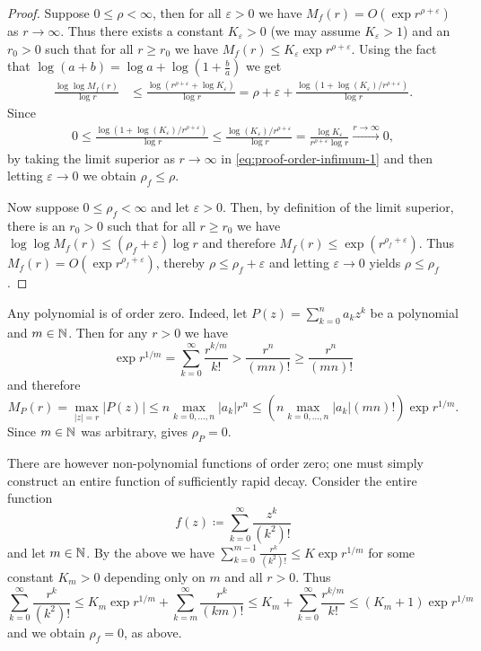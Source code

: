 \begin{proof}
    Suppose $0 \leq \rho < \infty$, then for all $\varepsilon > 0$ we have $M_f(r) = O(\exp r^{\rho + \varepsilon})$ as $r \to \infty$. Thus there exists a constant $K_\varepsilon > 0$ (we may assume $K_\varepsilon > 1$) and an $r_0 > 0$ such that for all $r \geq r_0$ we have $M_f(r) \leq K_\varepsilon \exp r^{\rho+\varepsilon}$. Using the fact that $\log (a+b) = \log a + \log (1 + \frac{b}{a})$ we get
    \begin{align*}
        \frac{\log \log M_f(r)}{\log r} &\leq \frac{\log (r^{\rho + \varepsilon} + \log K_\varepsilon)}{\log r} = \rho + \varepsilon + \frac{\log (1 + \log (K_\varepsilon) / r^{\rho + \varepsilon})}{\log r}. \tag{\textasteriskcentered} \label{eq:proof-order-infimum-1}
    \end{align*}
    Since
    \begin{align*}
        0 \leq \frac{\log (1 + \log (K_\varepsilon) / r^{\rho + \varepsilon})}{\log r} \leq \frac{\log (K_\varepsilon) / r^{\rho + \varepsilon}}{\log r} = \frac{\log K_\varepsilon}{r^{\rho + \varepsilon} \log r} \xrightarrow{r \to \infty} 0,
    \end{align*}
    by taking the limit superior as $r \to \infty$ in \eqref{eq:proof-order-infimum-1} and then letting $\varepsilon \to 0$ we obtain $\rho_f \leq \rho$.

    Now suppose $0 \leq \rho_f < \infty$ and let $\varepsilon > 0$. Then, by definition of the limit superior, there is an $r_0 > 0$ such that for all $r \geq r_0$ we have $ \log \log M_f(r) \leq (\rho_f + \varepsilon) \log r$ and therefore $M_f(r) \leq \exp(r^{\rho_f + \varepsilon})$. Thus $M_f(r) = O(\exp r^{\rho_f + \varepsilon})$, thereby $\rho \leq \rho_f + \varepsilon$ and letting $\varepsilon \to 0$ yields $\rho \leq \rho_f$.
\end{proof}

\begin{remark} \label{rem:order-zero}
    Any polynomial is of order zero. Indeed, let $P(z) = \sum_{k=0}^n a_k z^k$ be a polynomial and $m \in \mathbb{N}$. Then for any $r > 0$ we have
    $$ \exp r^{1/m} = \sum_{k=0}^\infty \frac{r^{k/m}}{k!} > \frac{r^{n}}{(mn)!} \geq \frac{r^{n}}{(mn)!} $$
    and therefore
    $$ M_P(r) = \max_{\vert z \vert = r} \vert P(z) \vert \leq n \max_{k = 0, \hdots, n} \vert a_k \vert r^n \leq \left( n \max_{k = 0, \hdots, n} \vert a_k \vert (mn)! \right) \exp r^{1/m}. $$
    Since $m \in \mathbb{N}$ was arbitrary,  gives $\rho_P = 0$.

    There are however non-polynomial functions of order zero; one must simply construct an entire function of sufficiently rapid decay. Consider the entire function
    $$ f(z) \coloneqq \sum_{k=0}^\infty \frac{z^k}{(k^2)!} $$
    and let $m \in \mathbb{N}$. By the above we have $\sum_{k=0}^{m-1} \frac{r^k}{(k^2)!} \leq K \exp r^{1/m}$ for some constant $K_m > 0$ depending only on $m$ and all $r > 0$. Thus
    $$ \sum_{k=0}^\infty \frac{r^k}{(k^2)!} \leq K_m \exp r^{1/m} + \sum_{k=m}^\infty \frac{r^k}{(km)!} \leq K_m + \sum_{k=0}^\infty \frac{r^{k/m}}{k!} \leq (K_m + 1) \exp r^{1/m} $$
    and we obtain $\rho_f = 0$, as above.
\end{remark}

